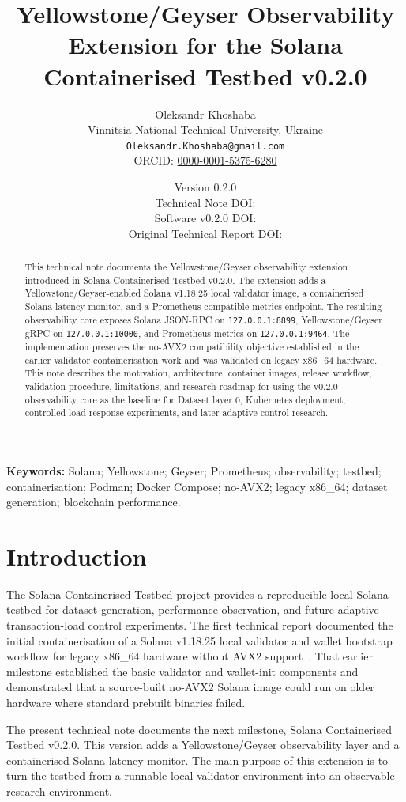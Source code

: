 \documentclass[11pt,a4paper]{article}
\title{
  \textbf{Yellowstone/Geyser Observability Extension for the Solana Containerised Testbed v0.2.0}
}
\author{
  Oleksandr Khoshaba\\
  Vinnitsia National Technical University, Ukraine\\
  \texttt{Oleksandr.Khoshaba@gmail.com}\\
  ORCID: \href{https://orcid.org/0000-0001-5375-6280}{0000-0001-5375-6280}
}
\date{
  Version 0.2.0\\
  Technical Note DOI: \href{https://doi.org/\TechnicalNoteDOI}{\TechnicalNoteDOI}\\
  Software v0.2.0 DOI: \href{https://doi.org/\SoftwareVersionDOI}{\SoftwareVersionDOI}\\
  Original Technical Report DOI: \href{https://doi.org/\OriginalReportDOI}{\OriginalReportDOI}
}
\begin{document}
\maketitle

\begin{abstract}
This technical note documents the Yellowstone/Geyser observability extension introduced in Solana Containerised Testbed v0.2.0. The extension adds a Yellowstone/Geyser-enabled Solana v1.18.25 local validator image, a containerised Solana latency monitor, and a Prometheus-compatible metrics endpoint. The resulting observability core exposes Solana JSON-RPC on \texttt{127.0.0.1:8899}, Yellowstone/Geyser gRPC on \texttt{127.0.0.1:10000}, and Prometheus metrics on \texttt{127.0.0.1:9464}. The implementation preserves the no-AVX2 compatibility objective established in the earlier validator containerisation work and was validated on legacy x86\_64 hardware. This note describes the motivation, architecture, container images, release workflow, validation procedure, limitations, and research roadmap for using the v0.2.0 observability core as the baseline for Dataset layer 0, Kubernetes deployment, controlled load response experiments, and later adaptive control research.
\end{abstract}

\noindent\textbf{Keywords:}
Solana; Yellowstone; Geyser; Prometheus; observability; testbed; containerisation; Podman; Docker Compose; no-AVX2; legacy x86\_64; dataset generation; blockchain performance.

\tableofcontents
\newpage

\section{Introduction}

The Solana Containerised Testbed project provides a reproducible local Solana testbed for dataset generation, performance observation, and future adaptive transaction-load control experiments. The first technical report documented the initial containerisation of a Solana v1.18.25 local validator and wallet bootstrap workflow for legacy x86\_64 hardware without AVX2 support~\cite{original-report}. That earlier milestone established the basic validator and wallet-init components and demonstrated that a source-built no-AVX2 Solana image could run on older hardware where standard prebuilt binaries failed.

The present technical note documents the next milestone, Solana Containerised Testbed v0.2.0. This version adds a Yellowstone/Geyser observability layer and a containerised Solana latency monitor. The main purpose of this extension is to turn the testbed from a runnable local validator environment into an observable research environment.
\end{document}

